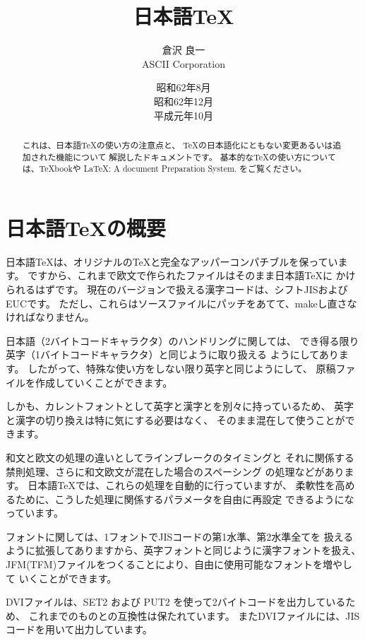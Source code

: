 \def\cs#1{$\backslash$\kern0pt#1}
\def\angle#1{$\langle$\kern0pt#1\kern0pt$\rangle$}

\title{日本語\TeX}
\author{倉沢 良一\\ASCII Corporation}
\date{昭和62年8月 \\ 昭和62年12月 \\ 平成元年10月}
\maketitle
\begin{abstract}
これは、日本語\TeX の使い方の注意点と、
\TeX の日本語化にともない変更あるいは追加された機能について
解説したドキュメントです。
基本的な\TeX の使い方については、\TeX bookや
\LaTeX: A document Preparation System. をご覧ください。
\end{abstract}

\section{日本語\TeX の概要}
日本語\TeX は、オリジナルの\TeX と完全なアッパーコンパチブルを保っています。
ですから、これまで欧文で作られたファイルはそのまま日本語\TeX に
かけられるはずです。
現在のバージョンで扱える漢字コードは、シフトJISおよびEUCです。
ただし、これらはソースファイルにパッチをあてて、makeし直さなければなりません。

日本語（2バイトコードキャラクタ）のハンドリングに関しては、
でき得る限り英字（1バイトコードキャラクタ）と同じように取り扱える
ようにしてあります。
したがって、特殊な使い方をしない限り英字と同じようにして、
原稿ファイルを作成していくことができます。

しかも、カレントフォントとして英字と漢字とを別々に持っているため、
英字と漢字の切り換えは特に気にする必要はなく、
そのまま混在して使うことができます。

和文と欧文の処理の違いとしてラインブレークのタイミングと
それに関係する禁則処理、さらに和文欧文が混在した場合のスペーシング
の処理などがあります。
日本語\TeX では、これらの処理を自動的に行っていますが、
柔軟性を高めるために、こうした処理に関係するパラメータを自由に再設定
できるようになっています。

フォントに関しては、1フォントでJISコードの第1水準、第2水準全てを
扱えるように拡張してありますから、英字フォントと同じように漢字フォントを扱え、
JFM(TFM)ファイルをつくることにより、自由に使用可能なフォントを増やして
いくことができます。

DVIファイルは、SET2 および PUT2 を使って2バイトコードを出力しているため、
これまでのものとの互換性は保たれています。
またDVIファイルには、JISコードを用いて出力しています。

